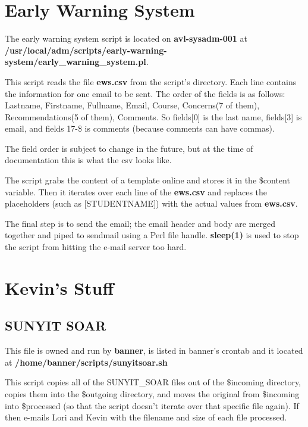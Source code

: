\documentclass[a4paper]{article}
\begin{document}
\section{Early Warning System}

The early warning system script is located on \textbf{avl-sysadm-001} at \textbf{/usr/local/adm/scripts/early-warning-system/early\_warning\_system.pl}.

This script reads the file \textbf{ews.csv} from the script's directory. Each line contains the information for one email to be sent. The order of the fields is as follows: Lastname, Firstname, Fullname, Email, Course, Concerns(7 of them), Recommendations(5 of them), Comments. So fields[0] is the last name, fields[3] is email, and fields 17-\$ is comments (because comments can have commas).

The field order is subject to change in the future, but at the time of documentation this is what the csv looks like.

The script grabs the content of a template online and stores it in the \$content variable. Then it iterates over each line of the \textbf{ews.csv} and replaces the placeholders (such as [STUDENTNAME]) with the actual values from \textbf{ews.csv}.

The final step is to send the email; the email header and body are merged together and piped to sendmail using a Perl file handle. \textbf{sleep(1)} is used to stop the script from hitting the e-mail server too hard.

\section{Kevin's Stuff}

\subsection{SUNYIT SOAR}
This file is owned and run by \textbf{banner}, is listed in banner's crontab and it located at \textbf{/home/banner/scripts/sunyitsoar.sh}

This script copies all of the SUNYIT\_SOAR files out of the \$incoming directory, copies them into the \$outgoing directory, and moves the original from \$incoming into \$processed (so that the script doesn't iterate over that specific file again). If then e-mails Lori and Kevin with the filename and size of each file processed.
\end{document}
